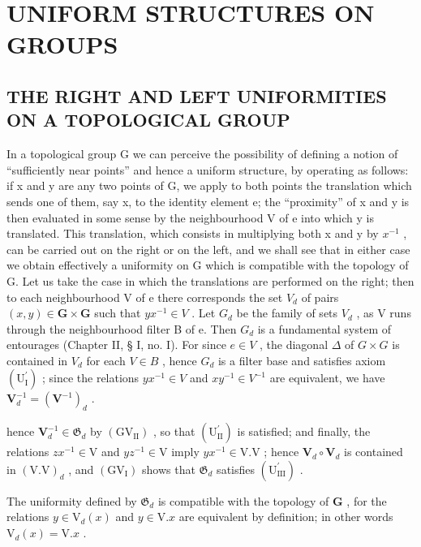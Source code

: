 \section{UNIFORM STRUCTURES ON GROUPS}

\subsection{THE RIGHT AND LEFT UNIFORMITIES ON A TOPOLOGICAL GROUP}

In a topological group G we can perceive the possibility of defining a notion of ``sufficiently near points'' and hence a uniform structure, by operating as follows: if x and y are any two points of G, we apply to both points the translation which sends one of them, say x, to the identity element e; the ``proximity'' of x and y is then evaluated in some sense by the neighbourhood V of e into which y is translated. This translation, which consists in multiplying both x and y by \(x^{-1}\) , can be carried out on the right or on the left, and we shall see that in either case we obtain effectively a uniformity on G which is compatible with the topology of G. Let us take the case in which the translations are performed on the right; then to each neighbourhood V of e there corresponds the set \(V_{d}\) of pairs \((x, y) \in \mathbf{G} \times \mathbf{G}\) such that \(yx^{-1} \in V\) . Let \(G_{d}\) be the family of sets \(V_{d}\) , as V runs through the neighbourhood filter B of e. Then \(G_{d}\) is a fundamental system of entourages (Chapter II, § I, no. I). For since \(e \in V\) , the diagonal \(\Delta\) of \(G \times G\) is contained in \(V_{d}\) for each \(V \in B\) , hence \(G_{d}\) is a filter base and satisfies axiom \((\mathrm{U}_{\mathrm{I}}^{\prime})\) ; since the relations \(yx^{-1} \in V\) and \(xy^{-1} \in V^{-1}\) are equivalent, we have \(\mathbf{V}_{d}^{-1} = (\mathbf{V}^{-1})_{d}\) .

hence \(\mathbf{V}_{d}^{-1}\in \mathfrak{G}_d\) by \((\mathrm{GV}_{\mathrm{II}})\) , so that \((\mathrm{U}_{\mathrm{II}}^{\prime})\) is satisfied; and finally, the relations \(zx^{-1}\in \mathrm{V}\) and \(yz^{-1}\in \mathrm{V}\) imply \(yx^{-1}\in \mathrm{V.V}\) ; hence \(\mathbf{V}_d\circ \mathbf{V}_d\) is contained in \((\mathrm{V.V})_d\) , and \((\mathrm{GV}_{\mathrm{I}})\) shows that \(\mathfrak{G}_d\) satisfies \((\mathrm{U}_{\mathrm{III}}^{\prime})\) .

The uniformity defined by \(\mathfrak{G}_d\) is compatible with the topology of \(\mathbf{G}\) , for the relations \(y \in \mathrm{V}_d(x)\) and \(y \in \mathrm{V}.x\) are equivalent by definition; in other words \(\mathrm{V}_d(x) = \mathrm{V}.x\) .


